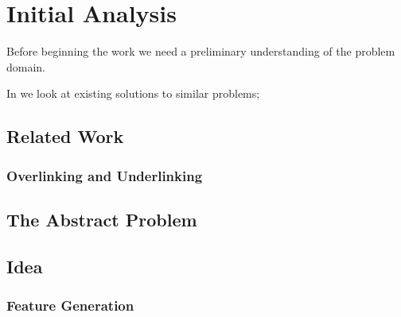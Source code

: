 \chapter{Initial Analysis}\label{chap:analysis}
Before beginning the work we need a preliminary understanding of the problem domain.

\begin{chapterorganization}
  \item In  we look at existing solutions to similar problems;
 
\end{chapterorganization}

\section{Related Work}\label{sec:related_work}



\subsection{Overlinking and Underlinking}

\section{The Abstract Problem} 


\section{Idea} 

\subsection{Feature Generation}
\dummy

%
